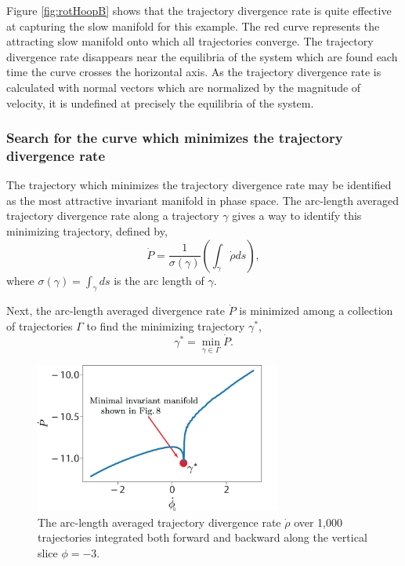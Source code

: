 \documentclass[twocolumn]{svjour3}
\begin{document}
Figure \ref{fig:rotHoopB} shows that the trajectory divergence rate is quite effective at capturing the slow manifold for this example. The red curve represents the attracting slow manifold onto which all trajectories converge. The trajectory divergence rate disappears near the equilibria of the system which are found each time the curve crosses the horizontal axis. As the trajectory divergence rate is calculated with normal vectors which are normalized by the magnitude of velocity, it is undefined at precisely the equilibria of the system.

\subsubsection{Search for the curve which minimizes the trajectory divergence rate}
The trajectory which minimizes the trajectory divergence rate may be identified as the most attractive invariant manifold in phase space. The arc-length averaged trajectory divergence rate along a trajectory $\gamma$ gives a way to identify this minimizing trajectory, defined by,
\begin{equation}
\dot{P}=\frac{1}{\sigma(\gamma)}\left(\int_\gamma\dot{\rho}ds\right),
\end{equation}
where $\sigma(\gamma)=\int_{\gamma}ds$ is the arc length of $\gamma$.

Next, the arc-length averaged divergence rate $\dot{P}$ is minimized among a collection of trajectories $\Gamma$ to find the minimizing trajectory $\gamma^*$,
\begin{equation}\label{eq:minimum}
\gamma^*=\min_{\gamma\in\Gamma}\dot{P}.
\end{equation}
\begin{figure}
\centering
\includegraphics[width=3.2in]{Fig10}
\caption{The arc-length averaged trajectory divergence rate $\dot{\rho}$ over 1,000 trajectories integrated both forward and backward along the vertical slice $\phi=-3$.}
\label{fig:min-rhodot}
\end{figure}
\end{document}
